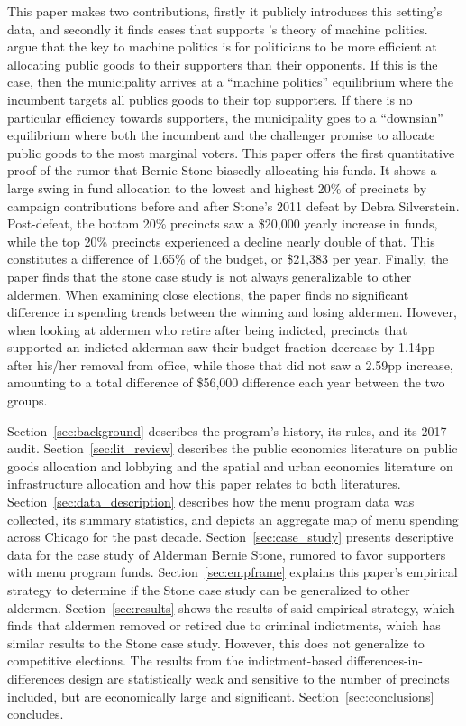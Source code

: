 This paper makes two contributions, firstly it publicly introduces this setting's data, and secondly it finds cases that supports \cite{dixit_londregan1996}'s theory of machine politics.
\cite{dixit_londregan1996} argue that the key to machine politics is for politicians to be more efficient at allocating public goods to their supporters than their opponents.
If this is the case, then the municipality arrives at a ``machine politics'' equilibrium where the incumbent targets all publics goods to their top supporters.
If there is no particular efficiency towards supporters, the municipality goes to a ``downsian'' equilibrium where both the incumbent and the challenger promise to allocate public goods to the most marginal voters.
This paper offers the first quantitative proof of the rumor that Bernie Stone biasedly allocating his funds.
It shows a large swing in fund allocation to the lowest and highest 20\% of precincts by campaign contributions before and after Stone's 2011 defeat by Debra Silverstein. 
Post-defeat, the bottom 20\% precincts saw a \$20,000 yearly increase in funds, while the top 20\% precincts experienced a decline nearly double of that.
This constitutes a difference of 1.65\% of the budget, or \$21,383 per year.
Finally, the paper finds that the stone case study is not always generalizable to other aldermen.
When examining close elections, the paper finds no significant difference in spending trends between the winning and losing aldermen.
However, when looking at aldermen who retire after being indicted, precincts that supported an indicted alderman saw their budget fraction decrease by 1.14pp after his/her removal from office, while those that did not saw a 2.59pp increase, amounting to a total difference of \$56,000 difference each year between the two groups.


Section~\ref{sec:background} describes the program's history, its rules, and its 2017 audit.
Section~\ref{sec:lit_review} describes the public economics literature on public goods allocation and lobbying and the spatial and urban economics literature on infrastructure allocation and how this paper relates to both literatures.
Section~\ref{sec:data_description} describes how the menu program data was collected, its summary statistics, and depicts an aggregate map of menu spending across Chicago for the past decade.
Section~\ref{sec:case_study} presents descriptive data for the case study of Alderman Bernie Stone, rumored to favor supporters with menu program funds. 
Section~\ref{sec:empframe} explains this paper's empirical strategy to determine if the Stone case study can be generalized to other aldermen.
Section~\ref{sec:results} shows the results of said empirical strategy, which finds that aldermen removed or retired due to criminal indictments, which has similar results to the Stone case study. 
However, this does not generalize to competitive elections.
The results from the indictment-based differences-in-differences design are statistically weak and sensitive to the number of precincts included, but are economically large and significant.
Section~\ref{sec:conclusions} concludes.

